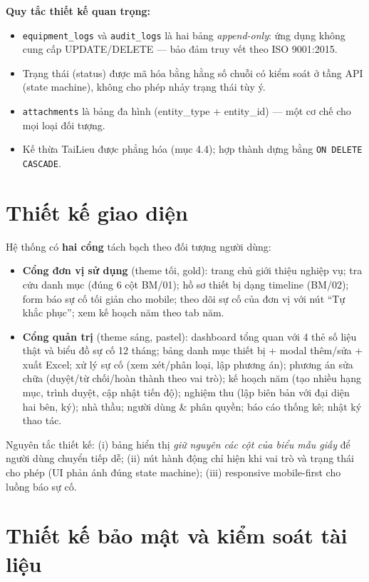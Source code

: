 \textbf{Quy tắc thiết kế quan trọng:}
\begin{itemize}
  \item \texttt{equipment\_logs} và \texttt{audit\_logs} là hai bảng \emph{append-only}: ứng dụng không cung cấp UPDATE/DELETE — bảo đảm truy vết theo ISO 9001:2015.
  \item Trạng thái (status) được mã hóa bằng hằng số chuỗi có kiểm soát ở tầng API (state machine), không cho phép nhảy trạng thái tùy ý.
  \item \texttt{attachments} là bảng đa hình (entity\_type + entity\_id) — một cơ chế cho mọi loại đối tượng.
  \item Kế thừa TaiLieu được phẳng hóa (mục 4.4); hợp thành dựng bằng \texttt{ON DELETE CASCADE}.
\end{itemize}

\section{Thiết kế giao diện}

Hệ thống có \textbf{hai cổng} tách bạch theo đối tượng người dùng:

\begin{itemize}
  \item \textbf{Cổng đơn vị sử dụng} (theme tối, gold): trang chủ giới thiệu nghiệp vụ; tra cứu danh mục (đúng 6 cột BM/01); hồ sơ thiết bị dạng timeline (BM/02); form báo sự cố tối giản cho mobile; theo dõi sự cố của đơn vị với nút ``Tự khắc phục''; xem kế hoạch năm theo tab năm.
  \item \textbf{Cổng quản trị} (theme sáng, pastel): dashboard tổng quan với 4 thẻ số liệu thật và biểu đồ sự cố 12 tháng; bảng danh mục thiết bị + modal thêm/sửa + xuất Excel; xử lý sự cố (xem xét/phân loại, lập phương án); phương án sửa chữa (duyệt/từ chối/hoàn thành theo vai trò); kế hoạch năm (tạo nhiều hạng mục, trình duyệt, cập nhật tiến độ); nghiệm thu (lập biên bản với đại diện hai bên, ký); nhà thầu; người dùng \& phân quyền; báo cáo thống kê; nhật ký thao tác.
\end{itemize}

Nguyên tắc thiết kế: (i) bảng hiển thị \emph{giữ nguyên các cột của biểu mẫu giấy} để người dùng chuyển tiếp dễ; (ii) nút hành động chỉ hiện khi vai trò và trạng thái cho phép (UI phản ánh đúng state machine); (iii) responsive mobile-first cho luồng báo sự cố.

\section{Thiết kế bảo mật và kiểm soát tài liệu}

